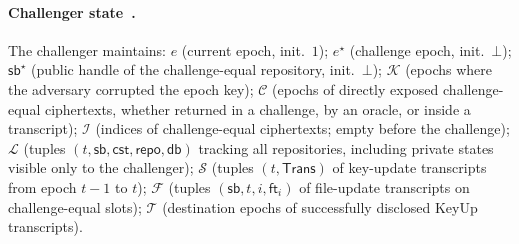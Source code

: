 \paragraph{Challenger state~\cite{CGLT23}.}
The challenger maintains:
$e$ (current epoch, init.\ $1$);
$e^\star$ (challenge epoch, init.\ $\bot$);
$\mathsf{sb}^\star$ (public handle of the challenge-equal repository, init.\ $\bot$);
$\mathcal{K}$ (epochs where the adversary corrupted the epoch key);
$\mathcal{C}$ (epochs of directly exposed challenge-equal ciphertexts, whether returned in a challenge, by an oracle, or inside a transcript);
$\mathcal{I}$ (indices of challenge-equal ciphertexts; empty before the challenge);
$\mathcal{L}$ (tuples $(t,\mathsf{sb},\mathsf{cst},\mathsf{repo},\mathsf{db})$ tracking all repositories, including private states visible only to the challenger);
$\mathcal{S}$ (tuples $(t,\mathsf{Trans})$ of key-update transcripts from epoch $t-1$ to $t$);
$\mathcal{F}$ (tuples $(\mathsf{sb},t,i,\mathsf{ft}_i)$ of file-update transcripts on challenge-equal slots);
$\mathcal{T}$ (destination epochs of successfully disclosed KeyUp transcripts).

